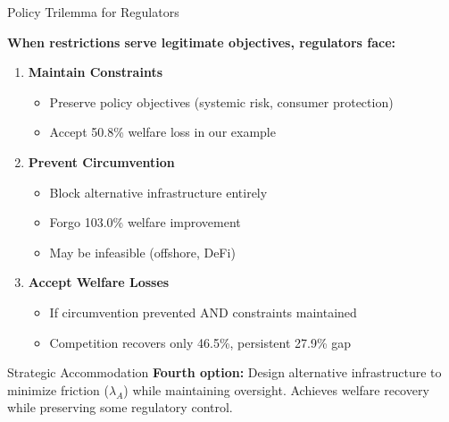 \documentclass[aspectratio=169]{beamer}
\begin{document}
\begin{frame}{Policy Trilemma for Regulators}
    
    \textbf{When restrictions serve legitimate objectives, regulators face:}
    
    \vspace{0.3cm}
    \begin{enumerate}
        \item \textbf{Maintain Constraints}
        \begin{itemize}
            \item Preserve policy objectives (systemic risk, consumer protection)
            \item Accept 50.8\% welfare loss in our example
        \end{itemize}
        
        \vspace{0.2cm}
        \item \textbf{Prevent Circumvention}
        \begin{itemize}
            \item Block alternative infrastructure entirely
            \item Forgo 103.0\% welfare improvement
            \item May be infeasible (offshore, DeFi)
        \end{itemize}
        
        \vspace{0.2cm}
        \item \textbf{Accept Welfare Losses}
        \begin{itemize}
            \item If circumvention prevented AND constraints maintained
            \item Competition recovers only 46.5\%, persistent 27.9\% gap
        \end{itemize}
    \end{enumerate}
    
    \vspace{0.3cm}
    \begin{alertblock}{Strategic Accommodation}
    \textbf{Fourth option:} Design alternative infrastructure to minimize friction ($\lambda_A$) while maintaining oversight. Achieves welfare recovery while preserving some regulatory control.
    \end{alertblock}

\end{frame}
\end{document}
